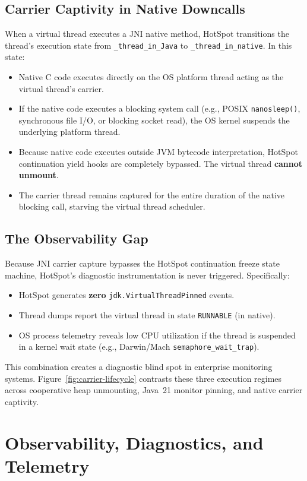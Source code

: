\subsection{Carrier Captivity in Native Downcalls}
When a virtual thread executes a JNI native method, HotSpot transitions the thread's execution state from \texttt{\_thread\_in\_Java} to \texttt{\_thread\_in\_native}. In this state:
\begin{itemize}
  \item Native C code executes directly on the OS platform thread acting as the virtual thread's carrier.
  \item If the native code executes a blocking system call (e.g., POSIX \texttt{nanosleep()}, synchronous file I/O, or blocking socket read), the OS kernel suspends the underlying platform thread.
  \item Because native code executes outside JVM bytecode interpretation, HotSpot continuation yield hooks are completely bypassed. The virtual thread \textbf{cannot unmount}.
  \item The carrier thread remains captured for the entire duration of the native blocking call, starving the virtual thread scheduler.
\end{itemize}

\subsection{The Observability Gap}
Because JNI carrier capture bypasses the HotSpot continuation freeze state machine, HotSpot's diagnostic instrumentation is never triggered. Specifically:
\begin{itemize}
  \item HotSpot generates \textbf{zero} \texttt{jdk.VirtualThreadPinned} events.
  \item Thread dumps report the virtual thread in state \texttt{RUNNABLE} (in native).
  \item OS process telemetry reveals low CPU utilization if the thread is suspended in a kernel wait state (e.g., Darwin/Mach \texttt{semaphore\_wait\_trap}).
\end{itemize}
This combination creates a diagnostic blind spot in enterprise monitoring systems. Figure~\ref{fig:carrier-lifecycle} contrasts these three execution regimes across cooperative heap unmounting, Java~21 monitor pinning, and native carrier captivity.



\section{Observability, Diagnostics, and Telemetry}
\label{sec:observability-diagnostics}


